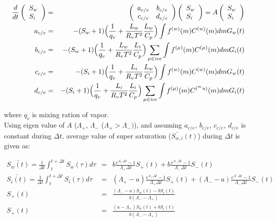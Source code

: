 \begin{eqnarray}
\frac{d}{dt}\left(
\begin{array}{l}
S_{w}\\
S_{i}\\
\end{array}\right )
&=&
\left(
\begin{array}{cc}
a_{c/e}& b_{c/e}\\
c_{c/e}& d_{c/e}
\end{array}\right)
\left(
\begin{array}{l}
S_{w}\\
S_{i}
\end{array}\right)
=
A
\left(
\begin{array}{l}
S_{w}\\
S_{i}
\end{array}\right)\\
a_{c/e}&=&-(S_{w}+1)\Bigl(\frac{1}{q_{v}}+\frac{L_{w}}{R_{v}T^{2}}\frac{L_{w}}{C_{p}}\Bigr )\int f^{(w)}(m)C^{(w)}(m)dm G_{w}(t)\nonumber\\
b_{c/e}&=&-(S_{w}+1)\Bigl(\frac{1}{q_{v}}+\frac{L_{w}}{R_{v}T^{2}}\frac{L_{i}}{C_{p}}\Bigr ) \sum_{\mu \in ice}\int f^{(\mu)}(m)C^{(\mu)}(m)dm G_{i}(t)\nonumber\\
c_{c/e}&=&-(S_{i}+1)\Bigl(\frac{1}{q_{v}}+\frac{L_{i}}{R_{v}T^{2}}\frac{L_{w}}{C_{p}}\Bigr ) \int f^{(w)}(m)C^{(w)}(m)dm G_{w}(t)\nonumber\\
d_{c/e}&=&-(S_{i}+1)\Bigl(\frac{1}{q_{v}}+\frac{L_{i}}{R_{v}T^{2}}\frac{L_{i}}{C_{p}}\Bigr ) \sum_{\mu \in ice}\int f^{(\mu)}(m)C^{(^mu)}(m)dm G_{i}(t)\nonumber
\end{eqnarray}


where $q_{v}$ is mixing ration of vapor. \\
Using eigen value of $A$ ($\Lambda_{+}$, $\Lambda_{-}$ ($\Lambda_{+}>\Lambda_{-})$), and assuming $a_{c/e}$, $b_{c/e}$, $c_{c/e}$, $d_{c/e}$ is constant during $\Delta t$, average value of super saturation ($\bar{S_{w,i}}(t)$) during $\Delta t$ is given as:

\begin{eqnarray}
\bar{S_{w}(t)}=\frac{1}{\Delta t}\int_{t}^{t+\Delta t}S_{w}(\tau)d\tau&=&b\frac{e^{\Lambda_{+}\Delta t}-1}{\Lambda_{+}\Delta t}S_{+}(t)+b\frac{e^{\Lambda_{-}\Delta t}-1}{\Lambda_{-}\Delta t}S_{-}(t)\nonumber\\
\bar{S_{i}(t)}=\frac{1}{\Delta t}\int_{t}^{t+\Delta t}S_{i}(\tau)d\tau&=&(\Lambda_{+}-a)\frac{e^{\Lambda_{+}\Delta t}-1}{\Lambda_{+}\Delta t}S_{+}(t)+(\Lambda_{-}-a)\frac{e^{\Lambda_{-}\Delta t}-1}{\Lambda_{-}\Delta t}S_{-}(t)\nonumber\\
S_{+}(t)&=&\frac{(\Lambda_{-}-a)S_{w}(t)-bS_{i}(t)}{b(\Lambda_{-}-\Lambda_{+})}\nonumber\\
S_{+}(t)&=&\frac{(a-\Lambda_{+})S_{w}(t)+bS_{i}(t)}{b(\Lambda_{-}-\Lambda_{+})}\nonumber
\end{eqnarray}


